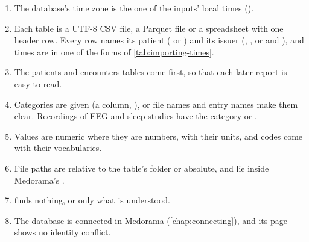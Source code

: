 \begin{enumerate}
\item The database's time zone is the one of the inputs' local times ().
\item Each table is a UTF-8 CSV file, a Parquet file or a spreadsheet with one header row. Every
  row names its patient ( or ) and its issuer
  (, , or  and
  ), and times are in one of the forms of \cref{tab:importing-times}.
\item The patients and encounters tables come first, so that each later report is easy to read.
\item Categories are given (a  column, ), or file names and entry
  names make them clear. Recordings of EEG and sleep studies have the category  or
  .
\item Values are numeric where they are numbers, with their units, and codes come with their
  vocabularies.
\item File paths are relative to the table's folder or absolute, and lie inside Medorama's
  .
\item {} finds nothing, or only what is understood.
\item The database is connected in Medorama (\cref{chap:connecting}), and its page shows no
  identity conflict.
\end{enumerate}
